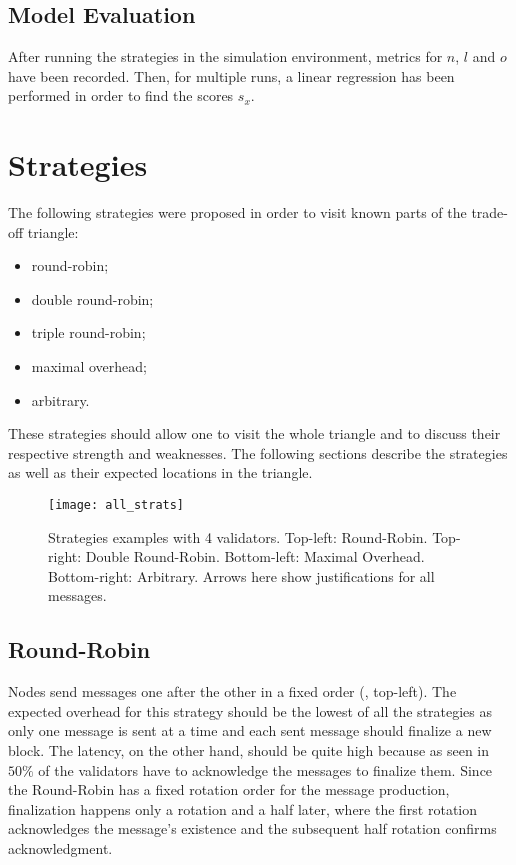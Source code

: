 \subsection{Model Evaluation}
After running the strategies in the simulation environment, metrics for \(n\),
\(l\) and \(o\) have been recorded. Then, for multiple runs, a linear regression
has been performed in order to find the scores \(s_x\).

\section{Strategies}
\label{sec:strategies}

The following strategies were proposed in order to visit known parts of the
trade-off triangle:
\begin{itemize}
        \item round-robin;
        \item double round-robin;
        \item triple round-robin;
        \item maximal overhead;
        \item arbitrary.
\end{itemize}
These strategies should allow one to visit the whole triangle and to discuss
their respective strength and weaknesses. The following sections describe the
strategies as well as their expected locations in the triangle.

\begin{figure}[h]
	\centering
	\texttt{[image: all\_strats]}
    \caption{Strategies examples with 4 validators. Top-left: Round-Robin.
    Top-right: Double Round-Robin. Bottom-left: Maximal Overhead. Bottom-right:
    Arbitrary. Arrows here show justifications for all messages.}
	\label{fig:allStrats}
\end{figure}

\subsection{Round-Robin}
Nodes send messages one after the other in a fixed order (,
top-left). The expected overhead for this strategy should be the lowest of all
the strategies as only one message is sent at a time and each sent message
should finalize a new block.  The latency, on the other hand, should be quite
high because as seen in  \(50\%\) of the validators have to
acknowledge the messages to finalize them. Since the Round-Robin has a fixed
rotation order for the message production, finalization happens only a rotation
and a half later, where the first rotation acknowledges the message's existence
and the subsequent half rotation confirms acknowledgment.

